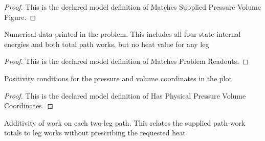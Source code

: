 \begin{proof}
  This is the declared model definition of Matches Supplied Pressure Volume Figure.
\end{proof}
\begin{definition}
  \label{def:physics:phyx-mini-0341:phyxminiproblems-problemphyxmini0341-matchesproblemreadouts}
  Numerical data printed in the problem. This includes all four state internal energies and both total path works, but no heat value for any leg
\end{definition}
\begin{proof}
  This is the declared model definition of Matches Problem Readouts.
\end{proof}
\begin{definition}
  \label{def:physics:phyx-mini-0341:phyxminiproblems-problemphyxmini0341-hasphysicalpressurevolumecoordinates}
  Positivity conditions for the pressure and volume coordinates in the plot
\end{definition}
\begin{proof}
  This is the declared model definition of Has Physical Pressure Volume Coordinates.
\end{proof}
\begin{definition}
  \label{def:physics:phyx-mini-0341:phyxminiproblems-problemphyxmini0341-satisfiespathworkadditivity}
  Additivity of work on each two-leg path. This relates the supplied path-work totals to leg works without prescribing the requested heat
\end{definition}
